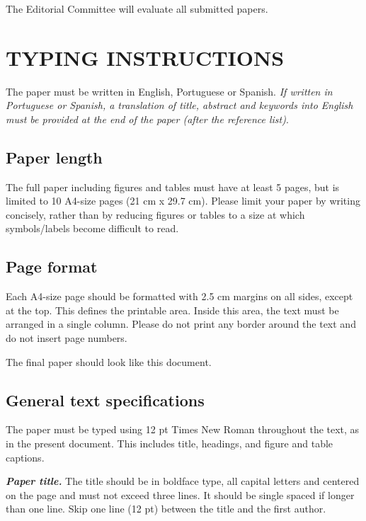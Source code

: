 \documentclass[12pt,fleqn]{article}
\begin{document}
The Editorial Committee will evaluate all submitted papers.

\section{TYPING INSTRUCTIONS}
The paper must be written in English, Portuguese or Spanish. {\it If written in Portuguese or Spanish, a translation of title, abstract and keywords into English must be provided at the end of the paper (after the reference list)}.

\newpage %
\subsection{Paper length}
The full paper including figures and tables must have at least 5 pages, but is limited to 10 A4-size pages (21 cm x 29.7 cm). Please limit your paper by writing concisely, rather than by reducing figures or tables to a size at which symbols/labels become difficult to read.

\subsection{Page format}
Each A4-size page should be formatted with 2.5 cm margins on all sides, except at the top. This defines the printable area. Inside this area, the text must be arranged in a single column. Please do not print any border around the text and do not insert page numbers.

The final paper should look like this document.

\subsection{General text specifications}

The paper must be typed using 12 pt Times New Roman throughout the text, as in the present document. This includes title, headings, and figure and table captions.

\vspace{0.5cm} %

\textbf{\textit{Paper title.}} The title should be in boldface type, all capital letters and centered on the page and must not exceed three lines. It should be single spaced if longer than one line. Skip one line (12 pt) between the title and the first author.

\vspace{0.5cm} %
\end{document}

